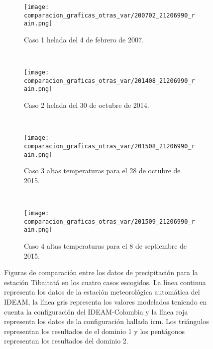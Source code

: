 \begin{figure}[H]
    
\begin{subfigure}[normla]{0.4\textwidth}
\caption{Caso 1 helada del 4 de febrero de 2007.}
\label{caso1_tiba_wrf_prec}
\texttt{[image: comparacion\_graficas\_otras\_var/200702\_21206990\_rain.png]}
\end{subfigure}
~
\begin{subfigure}[normla]{0.4\textwidth}
\caption{Caso 2 helada del 30 de octubre de 2014.}
\label{caso2_tiba_wrf_prec}
\texttt{[image: comparacion\_graficas\_otras\_var/201408\_21206990\_rain.png]}
\end{subfigure}
~
\centering
\begin{subfigure}[normla]{0.4\textwidth}
\caption{Caso 3 altas temperaturas para el 28 de octubre de 2015.}
\label{caso3_tiba_wrf_prec}
\texttt{[image: comparacion\_graficas\_otras\_var/201508\_21206990\_rain.png]}
\end{subfigure}
~
\centering
\begin{subfigure}[normla]{0.4\textwidth}
\caption{Caso 4 altas temperaturas para el 8 de septiembre de 2015.}
\label{caso4_tiba_wrf_prec}
\texttt{[image: comparacion\_graficas\_otras\_var/201509\_21206990\_rain.png]}
\end{subfigure}

    \caption{Figuras de comparación entre los datos de precipitación para la estación Tibaitatá en los cuatro casos escogidos. La línea continua representa los datos de la estación meteorológica automática del IDEAM, la línea gris representa los valores modelados teniendo en cuenta la configuración del IDEAM-Colombia y la línea roja representa los datos de la configuración hallada icm. Los triángulos representan los resultados de el dominio 1 y los pentágonos representan los resultados del dominio 2.}
    \label{fig:wrf_prec_tibaitata}
\end{figure}


